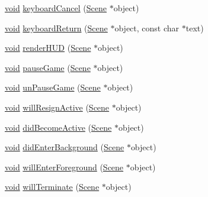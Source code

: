\begin{DoxyCompactItemize}
\item 
\mbox{\hyperlink{_thread_8h_af1e856da2e658414cb2456cb6f7ebc66}{void}} \mbox{\hyperlink{classnjli_1_1_scene_state_a4fb86e98a2622bf121bc8da38669307c}{keyboard\+Cancel}} (\mbox{\hyperlink{classnjli_1_1_scene}{Scene}} $\ast$object)
\item 
\mbox{\hyperlink{_thread_8h_af1e856da2e658414cb2456cb6f7ebc66}{void}} \mbox{\hyperlink{classnjli_1_1_scene_state_af2aa710b56f4cf5d513e71c1490d5f26}{keyboard\+Return}} (\mbox{\hyperlink{classnjli_1_1_scene}{Scene}} $\ast$object, const char $\ast$text)
\item 
\mbox{\hyperlink{_thread_8h_af1e856da2e658414cb2456cb6f7ebc66}{void}} \mbox{\hyperlink{classnjli_1_1_scene_state_a36c01e4a68cfcdf6b61ee8a52c878456}{render\+H\+UD}} (\mbox{\hyperlink{classnjli_1_1_scene}{Scene}} $\ast$object)
\item 
\mbox{\hyperlink{_thread_8h_af1e856da2e658414cb2456cb6f7ebc66}{void}} \mbox{\hyperlink{classnjli_1_1_scene_state_a7937319d3e5d2444f873841065b463bc}{pause\+Game}} (\mbox{\hyperlink{classnjli_1_1_scene}{Scene}} $\ast$object)
\item 
\mbox{\hyperlink{_thread_8h_af1e856da2e658414cb2456cb6f7ebc66}{void}} \mbox{\hyperlink{classnjli_1_1_scene_state_af9864d565dcf4da79041560e0167e0e3}{un\+Pause\+Game}} (\mbox{\hyperlink{classnjli_1_1_scene}{Scene}} $\ast$object)
\item 
\mbox{\hyperlink{_thread_8h_af1e856da2e658414cb2456cb6f7ebc66}{void}} \mbox{\hyperlink{classnjli_1_1_scene_state_affda631631e58dc23fab8a32f77311ca}{will\+Resign\+Active}} (\mbox{\hyperlink{classnjli_1_1_scene}{Scene}} $\ast$object)
\item 
\mbox{\hyperlink{_thread_8h_af1e856da2e658414cb2456cb6f7ebc66}{void}} \mbox{\hyperlink{classnjli_1_1_scene_state_ab9d94ea67665b6cd57396c3e383abfd3}{did\+Become\+Active}} (\mbox{\hyperlink{classnjli_1_1_scene}{Scene}} $\ast$object)
\item 
\mbox{\hyperlink{_thread_8h_af1e856da2e658414cb2456cb6f7ebc66}{void}} \mbox{\hyperlink{classnjli_1_1_scene_state_a6b10e154bd9f688b1e2eabb7e3f4d60e}{did\+Enter\+Background}} (\mbox{\hyperlink{classnjli_1_1_scene}{Scene}} $\ast$object)
\item 
\mbox{\hyperlink{_thread_8h_af1e856da2e658414cb2456cb6f7ebc66}{void}} \mbox{\hyperlink{classnjli_1_1_scene_state_a2117d146196a7b0d71900218105e2480}{will\+Enter\+Foreground}} (\mbox{\hyperlink{classnjli_1_1_scene}{Scene}} $\ast$object)
\item 
\mbox{\hyperlink{_thread_8h_af1e856da2e658414cb2456cb6f7ebc66}{void}} \mbox{\hyperlink{classnjli_1_1_scene_state_af24fbd52046a96068f4c95a7c8ba199a}{will\+Terminate}} (\mbox{\hyperlink{classnjli_1_1_scene}{Scene}} $\ast$object)

\end{DoxyCompactItemize}
